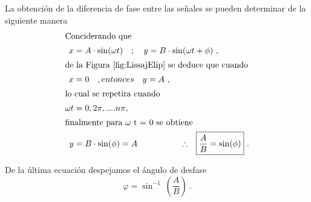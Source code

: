       La obtención de la diferencia de fase entre las señales se pueden determinar de la
      siguiente manera
      \begin{align}
         \intertext{Conciderando que}
         x &= A\cdot \sin(\omega t) \hspace{10pt} ; \hspace{10pt} y = B\cdot \sin(\omega t + \phi) \ , \notag \\ 
         \intertext{de la Figura \ref{fig:LissajElip} se deduce que cuando}
         x &= 0 \hspace{10pt} , entonces \hspace{10pt} y = A \ , \notag \\
         \intertext{lo cual se repetira cuando}
         \omega t &= 0, 2\pi, .... n\pi, \notag \\
         \intertext{finalmente para \( \omega \) t = 0 se obtiene}
         y &= B\cdot \sin(\phi) = A \hspace{50pt} \therefore \Aboxed{\dfrac{A}{B} = \sin(\phi)} \ . \notag 
      \end{align}
      
      \noindent De la última ecuación despejamos el ángulo de desfase
      \begin{equation}
         \boxed{\varphi = \sin^{-1}\ \left(\dfrac{A}{B} \right)}   \ . \label{eqn:AngDeDesf}   
      \end{equation}

